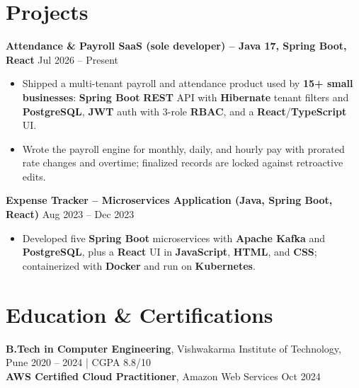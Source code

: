 \documentclass[a4paper,10pt]{article}
\begin{document}
\section*{Projects}

\textbf{Attendance \& Payroll SaaS (sole developer) -- Java 17, Spring Boot, React} \hfill Jul 2026 -- Present
\begin{itemize}[leftmargin=*]
    \item Shipped a multi-tenant payroll and attendance product used by \textbf{15+ small businesses}: \textbf{Spring Boot} \textbf{REST} API with \textbf{Hibernate} tenant filters and \textbf{PostgreSQL}, \textbf{JWT} auth with 3-role \textbf{RBAC}, and a \textbf{React}/\textbf{TypeScript} UI.
    \item Wrote the payroll engine for monthly, daily, and hourly pay with prorated rate changes and overtime; finalized records are locked against retroactive edits.
\end{itemize}

\textbf{Expense Tracker -- Microservices Application (Java, Spring Boot, React)} \hfill Aug 2023 -- Dec 2023
\begin{itemize}[leftmargin=*]
    \item Developed five \textbf{Spring Boot} microservices with \textbf{Apache Kafka} and \textbf{PostgreSQL}, plus a \textbf{React} UI in \textbf{JavaScript}, \textbf{HTML}, and \textbf{CSS}; containerized with \textbf{Docker} and run on \textbf{Kubernetes}.
\end{itemize}

\section*{Education \& Certifications}
\textbf{B.Tech in Computer Engineering}, Vishwakarma Institute of Technology, Pune \hfill 2020 -- 2024 \;|\; CGPA 8.8/10 \\
\textbf{AWS Certified Cloud Practitioner}, Amazon Web Services \hfill Oct 2024
\end{document}
